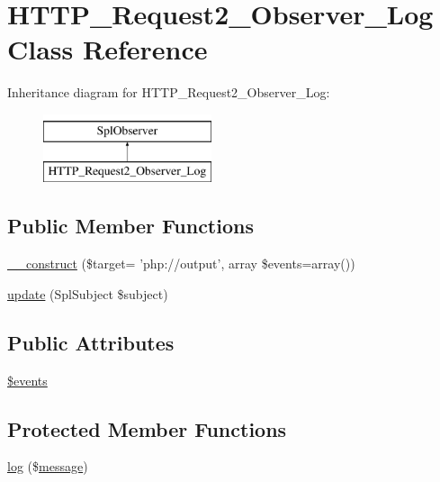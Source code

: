 \hypertarget{classHTTP__Request2__Observer__Log}{\section{H\-T\-T\-P\-\_\-\-Request2\-\_\-\-Observer\-\_\-\-Log Class Reference}
\label{classHTTP__Request2__Observer__Log}
}
Inheritance diagram for H\-T\-T\-P\-\_\-\-Request2\-\_\-\-Observer\-\_\-\-Log\-:\begin{figure}[H]
\begin{center}
\leavevmode
\includegraphics[height=2.000000cm]{classHTTP__Request2__Observer__Log}
\end{center}
\end{figure}
\subsection*{Public Member Functions}
\begin{DoxyCompactItemize}
\item 
\hyperlink{classHTTP__Request2__Observer__Log_ac52da3d54a5034de7e5883c792b0131d}{\-\_\-\-\_\-construct} (\$target= 'php\-://output', array \$events=array())
\item 
\hyperlink{classHTTP__Request2__Observer__Log_a3afb07b1a609c2f3c12b9cd5fa267947}{update} (Spl\-Subject \$subject)
\end{DoxyCompactItemize}
\subsection*{Public Attributes}
\begin{DoxyCompactItemize}
\item 
\hyperlink{classHTTP__Request2__Observer__Log_a28a4c14e527f6e34cbd3f0c1fa482e97}{\$events}
\end{DoxyCompactItemize}
\subsection*{Protected Member Functions}
\begin{DoxyCompactItemize}
\item 
\hyperlink{classHTTP__Request2__Observer__Log_a253f36793403dd77277fb2e76d19c117}{log} (\$\hyperlink{classmessage}{message})
\end{DoxyCompactItemize}
